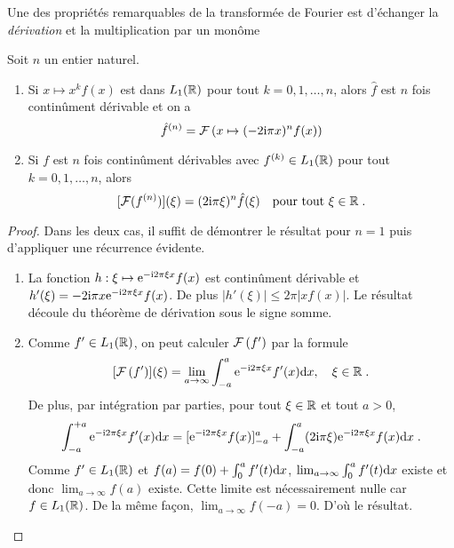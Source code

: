 Une des propri{\'e}t{\'e}s remarquables de la transform{\'e}e de Fourier est d'{\'e}changer la \emph{d{\'e}rivation} et la multiplication par un mon{\^o}me
\begin{proposition}
\label{prop:FourierDerivation}
Soit $n$ un entier naturel.
\begin{enumerate}
\item Si $x\mapsto x^k f(x)$ est dans $L_1(\mathbb{R})$  pour tout $k=0,1, \dots, n$, alors $\hat{f}$ est $n$ fois contin\^ument
  d{\'e}rivable et on a
$$
\hat{f}^{(n)} = \mathcal{F}\left( x\mapsto(-2 \mathrm{i} \pi x)^n f(x) \right)
$$
\item Si $f$ est $n$ fois contin\^ument d{\'e}rivables avec $f^{(k)} \in L_1(\mathbb{R})$ pour tout $k=0,1, \dots, n$, alors
$$
[\mathcal{F}(f^{(n)})](\xi) = (2 \mathrm{i} \pi \xi)^n \hat{f}(\xi) \quad\text{pour tout $\xi\in\mathbb{R}$}\;.
$$
\end{enumerate}
\end{proposition}
\begin{proof}
Dans les deux cas, il suffit de d{\'e}montrer le r{\'e}sultat pour $n=1$ puis d'appliquer une r{\'e}currence {\'e}vidente.
\begin{enumerate}
\item La fonction $h:\xi \mapsto \mathrm{e}^{- \mathrm{i} 2 \pi \xi x} f(x)$ est contin\^ument d{\'e}rivable
et $h'(\xi)= -2 \mathrm{i} \pi x \mathrm{e}^{- \mathrm{i} 2 \pi \xi x} f(x)$. De plus $|h'(\xi)| \leq 2 \pi |xf(x)|$.
Le r{\'e}sultat d{\'e}coule du th{\'e}or{\`e}me de d{\'e}rivation sous le signe somme.
\item Comme $f' \in L_1(\mathbb{R})$, on peut calculer $\mathcal{F}\left( f' \right)$ par la formule
$$
[\mathcal{F}\left( f' \right)](\xi) = \lim_{a \to \infty} \int_{-a}^a \mathrm{e}^{- \mathrm{i} 2 \pi \xi x} f'(x) \mathrm{d} x, \quad\xi\in\mathbb{R}\;.
$$
De plus, par int{\'e}gration par parties, pour tout $\xi\in\mathbb{R}$ et tout  $a>0$,
$$
\int_{-a}^{+a} \mathrm{e}^{- \mathrm{i} 2 \pi \xi x} f'(x) \mathrm{d} x = [ \mathrm{e}^{- \mathrm{i} 2 \pi \xi x} f(x) ]_{-a}^a + \int_{-a}^a (2 \mathrm{i} \pi \xi) \mathrm{e}^{- \mathrm{i} 2 \pi \xi x} f(x) \mathrm{d} x \;.
$$
Comme $f' \in L_1(\mathbb{R})$ et $f(a) = f(0) + \int_0^a f'(t) \mathrm{d} x$, $\lim_{a \to \infty} \int_0^a f'(t) \mathrm{d} x$ existe et donc
$\lim_{a \to \infty} f(a) $ existe. Cette limite est n{\'e}cessairement nulle car $f \in L_1(\mathbb{R})$. De la m{\^e}me fa\c{c}on,
$\lim_{a \to \infty} f(-a) = 0$. D'o{\`u} le r{\'e}sultat.
\end{enumerate}
\end{proof}

